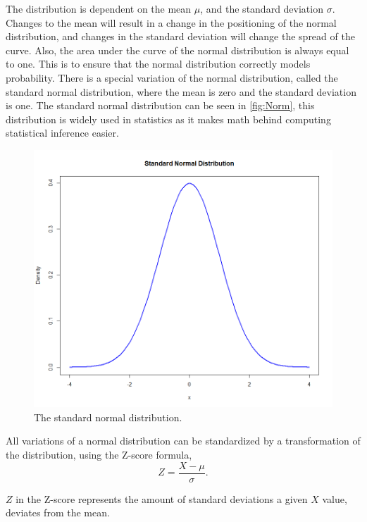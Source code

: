 \noindent The distribution is dependent on the mean $\mu$, and the standard deviation $\sigma$. Changes to the mean will result in a change in the positioning of the normal distribution, and changes in the standard deviation will change the spread of the curve. Also, the area under the curve of the normal distribution is always equal to one. This is to ensure that the normal distribution correctly models probability. There is a special variation of the normal distribution, called the standard normal distribution, where the mean is zero and the standard deviation is one. The standard normal distribution can be seen in \autoref{fig:Norm}, this distribution is widely used in statistics as it makes math behind computing statistical inference easier.
\begin{figure}[h!]
	\centering
	\begin{minipage}{0.80\textwidth}
		\centering
		\includegraphics[width=\linewidth]{billder/Normal distribution.png}
		\caption{The standard normal distribution.}
		\label{fig:Norm}
	\end{minipage}\hfill
\end{figure}
All variations of a normal distribution can be standardized by a transformation of the distribution, using the Z-score formula,
\newline
\begin{equation}
Z=\frac{X-\mu}{\sigma}.
\end{equation}


\noindent $Z$ in the Z-score represents the amount of standard deviations a given $X$ value, deviates from the mean.

